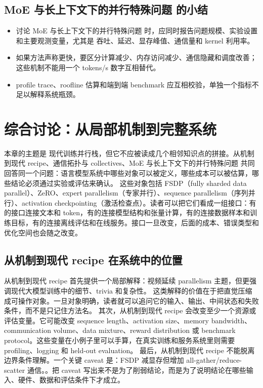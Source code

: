 \documentclass[a4paper]{article}
\begin{document}
\subsection{MoE 与长上下文下的并行特殊问题 的小结}
\begin{itemize}
\item 讨论 MoE 与长上下文下的并行特殊问题 时，应同时报告问题规模、实验设置和主要观测变量，尤其是 吞吐、延迟、显存峰值、通信量和 kernel 利用率。
\item 如果方法声称更快，要区分计算减少、内存访问减少、通信隐藏和调度改善；这些机制不能用一个 tokens/s 数字互相替代。
\item profile trace、roofline 估算和端到端 benchmark 应互相校验，单独一个指标不足以解释系统瓶颈。
\end{itemize}
\section{综合讨论：从局部机制到完整系统}
本章的主题是 现代训练并行栈，但它不应被读成几个相邻知识点的拼接。从机制到现代 recipe、通信拓扑与 collectives、MoE 与长上下文下的并行特殊问题 共同回答同一个问题：语言模型系统中哪些对象可以被定义，哪些成本可以被估算，哪些结论必须通过实验或评估来确认。
这些对象包括 FSDP（fully sharded data parallel）、ZeRO、expert parallelism（专家并行）、sequence parallelism（序列并行）、activation checkpointing（激活检查点）。读者可以把它们看成一组接口：有的接口连接文本和 token，有的连接模型结构和张量计算，有的连接数据样本和训练目标，有的连接离线评估和在线服务。接口一旦改变，后面的成本、错误类型和优化空间也会随之改变。
\subsection{从机制到现代 recipe 在系统中的位置}
从机制到现代 recipe 首先提供一个局部解释：视频延续 parallelism 主题，但更强调现代大模型训练中的细节、trivia 和复杂性。 这类解释的价值在于把直觉压缩成可操作对象。一旦对象明确，读者就可以追问它的输入、输出、中间状态和失败条件，而不是只记住方法名。
其次，从机制到现代 recipe 会改变至少一个资源或评估变量。它可能改变 sequence length、activation size、memory bandwidth、communication volume、data mixture、reward distribution 或 benchmark protocol。这些变量在小例子里可以手算，在真实训练和服务系统里则需要 profiling、logging 和 held-out evaluation。
最后，从机制到现代 recipe 不能脱离边界条件理解。一个关键 caveat 是：FSDP 减显存但增加 all-gather/reduce-scatter 通信。。把 caveat 写出来不是为了削弱结论，而是为了说明结论在哪些输入、硬件、数据和评估条件下才成立。
\end{document}
